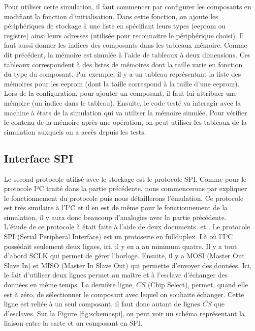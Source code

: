\documentclass[a4paper]{article}
\begin{document}
Pour utiliser cette simulation, il faut commencer par configurer les composants
en modifiant la fonction d'initialisation. Dans cette fonction, on ajoute les
périphériques de stockage à une liste en spécifiant leurs types (eeprom ou
registre) ainsi leurs adresses (utilisée pour reconnaitre le périphérique
choisi). Il faut aussi donner les indices des composants dans les tableaux
mémoire. Comme dit précédent, la mémoire est simulée à l'aide de tableaux à deux
dimensions. Ces tableaux correspondent à des listes de mémoires dont la taille
varie en fonction du type du composant. Par exemple, il y a un tableau
représentant la liste des mémoires pour les eeprom (dont la taille correspond à
la taille d'une eeprom). Lors de la configuration, pour ajouter un composant, il
faut lui attribuer une mémoire (un indice dans le tableau). Ensuite, le code
testé va interagir avec la machine à états de la simulation qui va utiliser la
mémoire simulée. Pour vérifier le contenu de la mémoire après une opération, on
peut utiliser les tableaux de la simulation auxquels on a accès depuis les
tests.
\subsection{Interface SPI}%

Le second protocole utilisé avec le stockage est le protocole SPI. Comme pour le
protocole I²C traité dans la partie précédente, nous commencerons par expliquer
le fonctionnement du protocole puis nous détaillerons l'émulation. Ce protocole
est très similaire à l'I²C et il en est de même pour le fonctionnement de la
simulation, il y aura donc beaucoup d'analogies avec la partie précédente.\\

L'étude de ce protocole à était faite à l'aide de deux documents.
\cite{dhaker2018introduction} et \cite{li2014design}. Le protocole SPI (Serial
Peripheral Interface) est un \gls{protoserie} en \gls{fullduplex}. Là où l'I²C
possédait seulement deux lignes, ici, il y en a au minimum quatre. Il y a tout
d'abord SCLK qui permet de gérer l'horloge. Ensuite, il y a MOSI (Master Out
Slave In) et MISO (Master In Slave Out) qui permette d'envoyer des données. Ici,
le fait d'utiliser deux lignes permet au maître et à l'esclave d'échanger des
données en même temps. La dernière ligne, $\overline{CS}$ (Chip Select), permet,
quand elle est à zéro, de sélectionner le composant avec lequel on souhaite
échanger. Cette ligne est reliée à un seul composant, il faut donc autant de
lignes $\overline{CS}$ que d'esclaves. Sur la Figure \ref{fig:schemaspi}, on
peut voir un schéma représentant la liaison entre la carte et un composant en
SPI.
\end{document}
